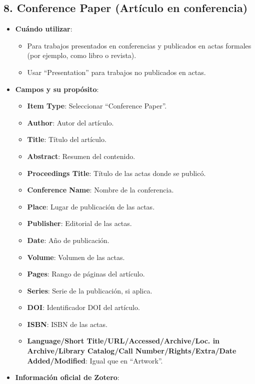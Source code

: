 \documentclass[
  jou,
  floatsintext,
  longtable,
  a4paper,
  nolmodern,
  notxfonts,
  notimes,
  colorlinks=true,linkcolor=blue,citecolor=blue,urlcolor=blue]{apa7}
\providecommand{\tightlist}{%
  \setlength{\itemsep}{0pt}\setlength{\parskip}{0pt}}
\begin{document}
\subsection{8. Conference Paper (Artículo en
conferencia)}\label{conference-paper-artuxedculo-en-conferencia}

\begin{itemize}
\tightlist
\item
  \textbf{Cuándo utilizar}:

  \begin{itemize}
  \tightlist
  \item
    Para trabajos presentados en conferencias y publicados en actas
    formales (por ejemplo, como libro o revista).
  \item
    Usar ``Presentation'' para trabajos no publicados en actas.
  \end{itemize}
\item
  \textbf{Campos y su propósito}:

  \begin{itemize}
  \tightlist
  \item
    \textbf{Item Type}: Seleccionar ``Conference Paper''.
  \item
    \textbf{Author}: Autor del artículo.
  \item
    \textbf{Title}: Título del artículo.
  \item
    \textbf{Abstract}: Resumen del contenido.
  \item
    \textbf{Proceedings Title}: Título de las actas donde se publicó.
  \item
    \textbf{Conference Name}: Nombre de la conferencia.
  \item
    \textbf{Place}: Lugar de publicación de las actas.
  \item
    \textbf{Publisher}: Editorial de las actas.
  \item
    \textbf{Date}: Año de publicación.
  \item
    \textbf{Volume}: Volumen de las actas.
  \item
    \textbf{Pages}: Rango de páginas del artículo.
  \item
    \textbf{Series}: Serie de la publicación, si aplica.
  \item
    \textbf{DOI}: Identificador DOI del artículo.
  \item
    \textbf{ISBN}: ISBN de las actas.
  \item
    \textbf{Language/Short Title/URL/Accessed/Archive/Loc. in
    Archive/Library Catalog/Call Number/Rights/Extra/Date
    Added/Modified}: Igual que en ``Artwork''.
  \end{itemize}
\item
  \textbf{Información oficial de Zotero}:


\end{itemize}
\end{document}
